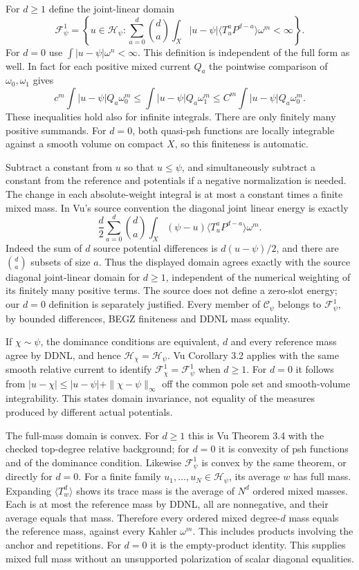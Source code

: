 \documentclass[
  11pt,
]{article}
\begin{document}
For \(d\geq1\) define the joint-linear domain \[
\mathcal{F}^1_\psi=\left\{u\in\mathcal{H}_\psi:
\sum_{a=0}^d\binom da\int_X|u-\psi|\langle T_u^aP^{d-a}\rangle\omega^m<\infty\right\}.
\] For \(d=0\) use \(\int|u-\psi|\omega^n<\infty\). This definition is
independent of the full form as well. In fact for each positive mixed
current \(Q_a\) the pointwise comparison of \(\omega_0,\omega_1\) gives
\[
c^m\int|u-\psi|Q_a\omega_0^m\leq\int|u-\psi|Q_a\omega_1^m
\leq C^m\int|u-\psi|Q_a\omega_0^m.
\] These inequalities hold also for infinite integrals. There are only
finitely many positive summands. For \(d=0\), both quasi-psh functions
are locally integrable against a smooth volume on compact \(X\), so this
finiteness is automatic.

Subtract a constant from \(u\) so that \(u\leq\psi\), and simultaneously
subtract a constant from the reference and potentials if a negative
normalization is needed. The change in each absolute-weight integral is
at most a constant times a finite mixed mass. In Vu's source convention
the diagonal joint linear energy is exactly \[
\frac d2\sum_{a=0}^d\binom da\int_X(\psi-u)\langle T_u^aP^{d-a}\rangle\omega^m.
\] Indeed the sum of \(d\) source potential differences is
\(d(u-\psi)/2\), and there are \(\binom da\) subsets of size \(a\). Thus
the displayed domain agrees exactly with the source diagonal
joint-linear domain for \(d\geq1\), independent of the numerical
weighting of its finitely many positive terms. The source does not
define a zero-slot energy; our \(d=0\) definition is separately
justified. Every member of \(\mathcal{C}_\psi\) belongs to
\(\mathcal{F}^1_\psi\), by bounded differences, BEGZ finiteness and DDNL
mass equality.

If \(\chi\sim\psi\), the dominance conditions are equivalent, \(d\) and
every reference mass agree by DDNL, and hence
\(\mathcal{H}_\chi=\mathcal{H}_\psi\). Vu Corollary 3.2 applies with the
same smooth relative current to identify
\(\mathcal{F}^1_\chi=\mathcal{F}^1_\psi\) when \(d\geq1\). For \(d=0\) it
follows from \(|u-\chi|\leq|u-\psi|+\|\chi-\psi\|_\infty\) off the
common pole set and smooth-volume integrability. This states domain
invariance, not equality of the measures produced by different actual
potentials.

The full-mass domain is convex. For \(d\geq1\) this is Vu Theorem 3.4
with the checked top-degree relative background; for \(d=0\) it is
convexity of psh functions and of the dominance condition. Likewise
\(\mathcal{F}^1_\psi\) is convex by the same theorem, or directly for
\(d=0\). For a finite family \(u_1,\ldots,u_N\in\mathcal{H}_\psi\), its
average \(w\) has full mass. Expanding \(\langle T_w^d\rangle\) shows
its trace mass is the average of \(N^d\) ordered mixed masses. Each is
at most the reference mass by DDNL, all are nonnegative, and their
average equals that mass. Therefore every ordered mixed degree-\(d\)
mass equals the reference mass, against every Kahler \(\omega^m\). This
includes products involving the anchor and repetitions. For \(d=0\) it
is the empty-product identity. This supplies mixed full mass without an
unsupported polarization of scalar diagonal equalities.
\end{document}
